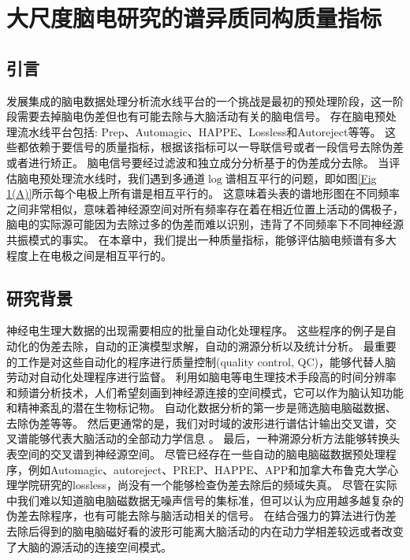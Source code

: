 \chapter{大尺度脑电研究的谱异质同构质量指标}

\section{引言}
发展集成的脑电数据处理分析流水线平台的一个挑战是最初的预处理阶段，这一阶段需要去掉脑电伪差但也有可能去除与大脑活动有关的脑电信号。 存在脑电预处理流水线平台包括: Prep、Automagic、HAPPE、Lossless和Autoreject等等。 这些都依赖于要信号的质量指标，根据该指标可以一导联信号或者一段信号去除伪差或者进行矫正。 脑电信号要经过滤波和独立成分分析基于的伪差成分去除。 当评估脑电预处理流水线时，我们遇到多通道$\log$谱相互平行的问题，即如图\ref{Fig 1(A)}所示每个电极上所有谱是相互平行的。 这意味着头表的谱地形图在不同频率之间非常相似，意味着神经源空间对所有频率存在着在相近位置上活动的偶极子，脑电的实际源可能因为去除过多的伪差而难以识别，违背了不同频率下不同神经源共振模式的事实。 在本章中，我们提出一种质量指标，能够评估脑电频谱有多大程度上在电极之间是相互平行的。

\section{研究背景}
神经电生理大数据的出现需要相应的批量自动化处理程序。 这些程序的例子是自动化的伪差去除，自动的正演模型求解，自动的溯源分析以及统计分析。 最重要的工作是对这些自动化的程序进行质量控制(quality control, QC)，能够代替人脑劳动对自动化处理程序进行监督。 利用如脑电等电生理技术手段高的时间分辨率和频谱分析技术，人们希望刻画到神经源连接的空间模式，它可以作为脑认知功能和精神紊乱的潜在生物标记物。 自动化数据分析的第一步是筛选脑电脑磁数据、去除伪差等等。 然后更通常的是，我们对时域的波形进行谱估计输出交叉谱，交叉谱能够代表大脑活动的全部动力学信息 。 最后，一种溯源分析方法能够转换头表空间的交叉谱到神经源空间。 尽管已经存在一些自动的脑电脑磁数据预处理程序，例如Automagic、autoreject、PREP、HAPPE、APP和加拿大布鲁克大学心理学院研究的lossless，尚没有一个能够检查伪差去除后的频域失真。 尽管在实际中我们难以知道脑电脑磁数据无噪声信号的集标准，但可以认为应用越多越复杂的伪差去除程序，也有可能去除与脑活动相关的信号。 在结合强力的算法进行伪差去除后得到的脑电脑磁好看的波形可能离大脑活动的内在动力学相差较远或者改变了大脑的源活动的连接空间模式。

